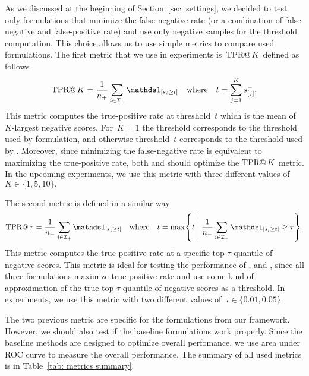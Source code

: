 As we discussed at the beginning of Section~\ref{sec: settings}, we decided to test only formulations that minimize the false-negative rate (or a combination of false-negative and false-positive rate) and use only negative samples for the threshold computation. This choice allows us to use simple metrics to compare used formulations. The first metric that we use in experiments is~$\operatorname{TPR@}K$ defined as follows
\begin{equation*}
  \tpratk = \frac{1}{\npos} \sum_{i \in \Ipos} \Iverson{s_i \geq t} \quad \text{where} \quad t = \sum_{j = 1}^{K} s^{-}_{[j]}.
\end{equation*}
This metric computes the true-positive rate at threshold~$t$ which is the mean of $K$-largest negative scores. For~$K = 1$ the threshold corresponds to the threshold used by \TopPush formulation, and otherwise threshold~$t$ corresponds to the threshold used by \TopPushK. Moreover, since minimizing the false-negative rate is equivalent to maximizing the true-positive rate, both \TopPush and \TopPushK should optimize the $\operatorname{TPR@}K$ metric. In the upcoming experiments, we use this metric with three different values of~$K \in \{1, 5, 10\}.$

The second metric is defined in a similar way
\begin{equation*}
  \tpratfpr = \frac{1}{\npos} \sum_{i \in \Ipos} \Iverson{s_i \geq t} \quad \text{where} \quad t
  = \max \Set{t}{\frac{1}{\nneg} \sum_{i \in \Ineg} \Iverson{s_i \geq t} \geq \tau}.
\end{equation*}
This metric computes the true-positive rate at a specific top $\tau$-quantile of negative scores. This metric is ideal for testing the performance of \Grill, \tauFPL and \PatMatNP, since all three formulations maximize true-positive rate and use some kind of approximation of the true top $\tau$-quantile of negative scores as a threshold. In experiments, we use this metric with two different values of~$\tau \in \{0.01, 0.05\}.$ 

The two previous metric are specific for the formulations from our framework. However, we should also test if the baseline formulations work properly. Since the baseline methods are designed to optimize overall perfomance, we use area under ROC curve to measure the overall performance. The summary of all used metrics is in Table~\ref{tab: metrics summary}.

